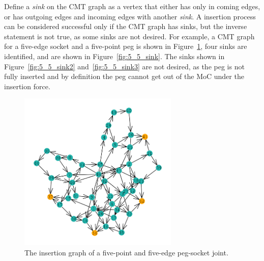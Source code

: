 \documentclass[11pt, twocolumn]{article}
\begin{document}

Define a {\em sink} on the CMT graph as a vertex that either has only in coming edges, or has outgoing edges and incoming  edges with another {\em sink}. A insertion process can be considered successful only if the CMT graph has sinks, but the inverse statement is not true, as some sinks are not desired. For example, a CMT graph for a five-edge socket and a five-point peg is shown in Figure~\ref{fig:insertion_graph}, four sinks are identified, and are shown in Figure~\ref{fig:5_5_sink}. The sinks shown in Figure~\ref{fig:5_5_sink2} and~\ref{fig:5_5_sink3} are not desired, as the peg is not fully inserted and by definition the peg cannot get out of the MoC under the insertion force. 


\begin{figure}
\begin{center}
\includegraphics[width=3in]{figures/insertion_graph.png}
\end{center}
\caption{The insertion graph of a five-point and five-edge peg-socket joint. }
\label{fig:insertion_graph}
\end{figure}
\end{document}
